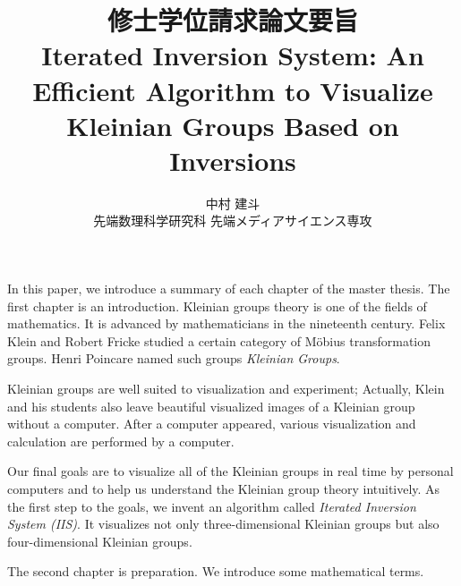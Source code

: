 \documentclass[uplatex, dvipdfmx]{article}
\title{修士学位請求論文要旨\\
 Iterated Inversion System: An Efficient Algorithm to Visualize Kleinian Groups Based on Inversions }
\author{中村 建斗\\
先端数理科学研究科 先端メディアサイエンス専攻\\
}
\date{}
\begin{document}
\maketitle
\pagestyle{plain}
\newpage

In this paper, we introduce a summary of each chapter of the master thesis.
The first chapter is an introduction.
Kleinian groups theory is one of the fields of mathematics.
It is advanced by mathematicians in the nineteenth century.
Felix Klein and Robert Fricke studied a certain category of M\"obius
transformation groups.
Henri Poincare named such groups \textit{Kleinian Groups}.

Kleinian groups are well suited to visualization and
experiment; Actually, Klein and his students also leave beautiful
visualized images of a Kleinian group without a computer.
After a computer appeared, various visualization and calculation are
performed by a computer.

Our final goals are to visualize all of the Kleinian groups in real time
by personal computers and to help us understand the Kleinian group theory
intuitively.
As the first step to the goals, we invent an algorithm called
\textit{Iterated Inversion System (IIS)}.
It visualizes not only three-dimensional Kleinian groups but also
four-dimensional Kleinian groups.

The second chapter is preparation. We introduce some mathematical terms.
\end{document}
